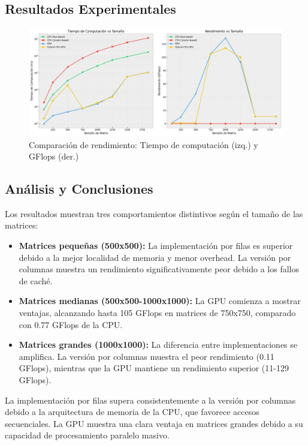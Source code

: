 \documentclass[11pt]{article}
\begin{document}
\subsection{Resultados Experimentales}
\begin{figure}[h]
    \centering
    \includegraphics[width=\textwidth]{grafica.png}
    \caption{Comparación de rendimiento: Tiempo de computación (izq.) y GFlops (der.)}
    \label{fig:performance}
\end{figure}

\subsection{Análisis y Conclusiones}
Los resultados muestran tres comportamientos distintivos según el tamaño de las matrices:

\begin{itemize}
    \item \textbf{Matrices pequeñas \< (500x500):} La implementación por filas es superior debido a la mejor localidad de memoria y menor overhead. La versión por columnas muestra un rendimiento significativamente peor debido a los fallos de caché.
    
    \item \textbf{Matrices medianas (500x500-1000x1000):} La GPU comienza a mostrar ventajas, alcanzando hasta 105 GFlops en matrices de 750x750, comparado con 0.77 GFlops de la CPU.
    
    \item \textbf{Matrices grandes \> (1000x1000):} La diferencia entre implementaciones se amplifica. La versión por columnas muestra el peor rendimiento (0.11 GFlops), mientras que la GPU mantiene un rendimiento superior (11-129 GFlops).
\end{itemize}

La implementación por filas supera consistentemente a la versión por columnas debido a la arquitectura de memoria de la CPU, que favorece accesos secuenciales. La GPU muestra una clara ventaja en matrices grandes debido a su capacidad de procesamiento paralelo masivo.
\end{document}
